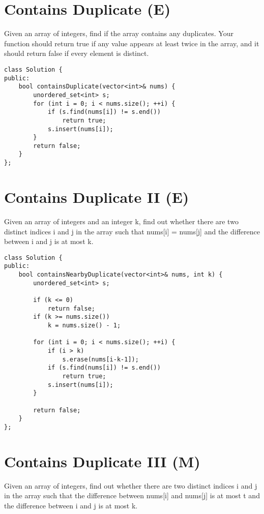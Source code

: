 \section{Contains Duplicate (E)}
Given an array of integers, find if the array contains any duplicates. Your function should return true if any value appears at least twice in the array, and it should return false if every element is distinct. \\

\begin{lstlisting}
class Solution {
public:
    bool containsDuplicate(vector<int>& nums) {
        unordered_set<int> s;
        for (int i = 0; i < nums.size(); ++i) {
            if (s.find(nums[i]) != s.end())
                return true;
            s.insert(nums[i]);
        }
        return false;
    }
};
\end{lstlisting}


\section{Contains Duplicate II (E)}
Given an array of integers and an integer k, find out whether there are two distinct indices i and j in the array such that nums[i] = nums[j] and the difference between i and j is at most k. \\

\begin{lstlisting}
class Solution {
public:
    bool containsNearbyDuplicate(vector<int>& nums, int k) {
        unordered_set<int> s;
        
        if (k <= 0) 
            return false;
        if (k >= nums.size()) 
            k = nums.size() - 1;
       
        for (int i = 0; i < nums.size(); ++i) {
            if (i > k) 
                s.erase(nums[i-k-1]);
            if (s.find(nums[i]) != s.end())
                return true;
            s.insert(nums[i]);
        }
        
        return false;
    }
};
\end{lstlisting}


\section{Contains Duplicate III (M)}
Given an array of integers, find out whether there are two distinct indices i and j in the array such that the difference between nums[i] and nums[j] is at most t and the difference between i and j is at most k. \\

